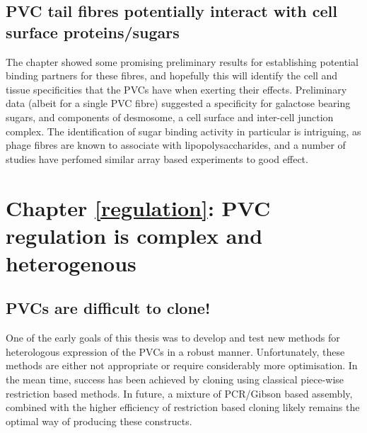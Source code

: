 \subsection{PVC tail fibres potentially interact with cell surface proteins/sugars}
The chapter showed some promising preliminary results for establishing potential binding partners for these fibres, and hopefully this will identify the cell and tissue specificities that the PVCs have when exerting their effects. Preliminary data (albeit for a single PVC fibre) suggested a specificity for galactose bearing sugars, and components of desmosome, a cell surface and inter-cell junction complex. The identification of sugar binding activity in particular is intriguing, as phage fibres are known to associate with lipopolysaccharides, and a number of studies have perfomed similar array based experiments to good effect.


\section{Chapter \ref{regulation}: PVC regulation is complex and heterogenous}
\subsection{PVCs are difficult to clone!}
One of the early goals of this thesis was to develop and test new methods for heterologous expression of the PVCs in a robust manner. Unfortunately, these methods are either not appropriate or require considerably more optimisation. In the mean time, success has been achieved by cloning using classical piece-wise restriction based methods. In future, a mixture of PCR/Gibson based assembly, combined with the higher efficiency of restriction based cloning likely remains the optimal way of producing these constructs.

